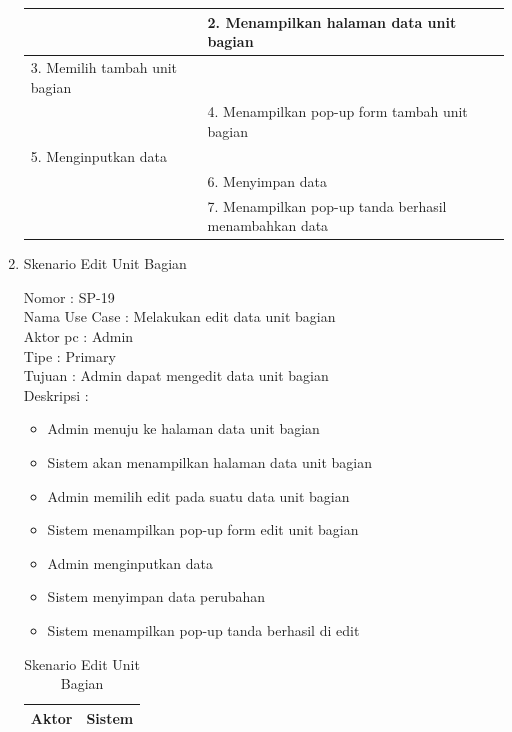 \begin{enumerate}
\begin{table}
\begin{tabular}{ | p{55mm} | p{73mm} |}
		\hline
		
		&  2.	Menampilkan halaman data unit bagian \\
		
		\hline
		
		3. Memilih tambah unit bagian & \\
		
		\hline
		
		& 4.	Menampilkan pop-up form tambah unit bagian \\
		
		\hline
		
		5.	Menginputkan data  & \\
		\hline
		
		& 6.	Menyimpan data \\
		\hline
		
		& 7.	Menampilkan pop-up tanda berhasil menambahkan data \\
		\hline
		
	\end{tabular}
\end{table}

\item Skenario Edit Unit Bagian

Nomor \kern 3.6pc : SP-19 \\
Nama Use Case : Melakukan edit data unit bagian \\
Aktor  pc : Admin \\
Tipe \kern 4.6pc : Primary \\
Tujuan \kern 3.6pc : Admin dapat mengedit data unit bagian \\
Deskripsi \kern 2.5pc : 

\begin{itemize}
	\item Admin menuju ke halaman data unit bagian
	\item Sistem akan menampilkan halaman data unit bagian
	\item Admin memilih edit pada suatu data unit bagian
	\item Sistem menampilkan pop-up form edit unit bagian
	\item Admin menginputkan data
	\item Sistem menyimpan data perubahan
	\item Sistem menampilkan pop-up tanda berhasil di edit
	
\end{itemize}

\begin{table}
	\caption{Skenario Edit Unit Bagian}
	\centering
	\begin{tabular}{ | p{55mm} | p{73mm} |}
		\hline 
		\textbf{Aktor} & \textbf{Sistem} \\
		\hline
		

\end{tabular}
\end{table}
\end{enumerate}
